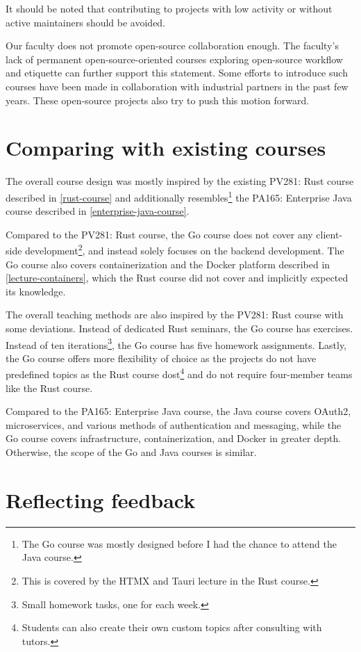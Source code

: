 \documentclass[
  digital,
  color,
  oneside,
  nosansbold,
  nocolorbold,
  nolof,
  nolot,
]{fithesis4}
\begin{document}
It should be noted that contributing to projects with low activity or without active maintainers should be avoided.

Our faculty does not promote open-source collaboration enough. The faculty's lack of permanent open-source-oriented courses exploring open-source workflow and etiquette can further support this statement. Some efforts to introduce such courses have been made in collaboration with industrial partners in the past few years. These open-source projects also try to push this motion forward.

\section{Comparing with existing courses}\label{reflect-course}

The overall course design was mostly inspired by the existing PV281: Rust course described in \cref{rust-course} and additionally resembles\footnote{The Go course was mostly designed before I had the chance to attend the Java course.} the PA165: Enterprise Java course described in \cref{enterprise-java-course}.

Compared to the PV281: Rust course, the Go course does not cover any client-side development\footnote{This is covered by the HTMX and Tauri lecture in the Rust course.}, and instead solely focuses on the backend development. The Go course also covers containerization and the Docker platform described in \cref{lecture-containers}, which the Rust course did not cover and implicitly expected its knowledge. 

The overall teaching methods are also inspired by the PV281: Rust course with some deviations. Instead of dedicated Rust seminars, the Go course has exercises. Instead of ten iterations\footnote{Small homework tasks, one for each week.}, the Go course has five homework assignments. Lastly, the Go course offers more flexibility of choice as the projects do not have predefined topics as the Rust course dost\footnote{Students can also create their own custom topics after consulting with tutors.} and do not require four-member teams like the Rust course.

Compared to the PA165: Enterprise Java course, the Java course covers OAuth2, microservices, and various methods of authentication and messaging, while the Go course covers infrastructure, containerization, and Docker in greater depth. Otherwise, the scope of the Go and Java courses is similar.

\section{Reflecting feedback}\label{reflect-feedback}
\end{document}
